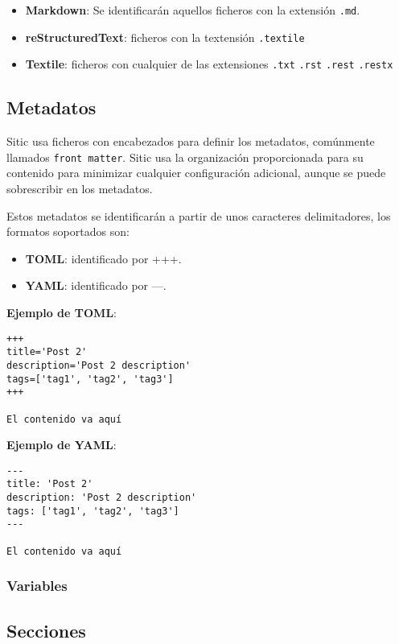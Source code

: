 \begin{itemize}
    \item \textbf{Markdown}: Se identificarán aquellos ficheros con la extensión \texttt{.md}.
    \item \textbf{reStructuredText}: ficheros con la textensión \texttt{.textile}
    \item \textbf{Textile}: ficheros con cualquier de las extensiones \texttt{.txt} \texttt{.rst} \texttt{.rest} \texttt{.restx}
\end{itemize}

\subsection{Metadatos}

Sitic usa ficheros con encabezados para definir los metadatos, comúnmente llamados \texttt{front matter}.
Sitic usa la organización proporcionada para su contenido para minimizar cualquier
configuración adicional, aunque se puede sobrescribir en los metadatos.

Estos metadatos se identificarán a partir de unos caracteres delimitadores, los formatos soportados son:

\begin{itemize}
    \item \textbf{TOML}: identificado por +++.
    \item \textbf{YAML}: identificado por ---.
\end{itemize}

\textbf{Ejemplo de TOML}:

\begin{verbatim}
+++
title='Post 2'
description='Post 2 description'
tags=['tag1', 'tag2', 'tag3']
+++

El contenido va aquí
\end{verbatim}

\textbf{Ejemplo de YAML}:

\begin{verbatim}
---
title: 'Post 2'
description: 'Post 2 description'
tags: ['tag1', 'tag2', 'tag3']
---

El contenido va aquí
\end{verbatim}

\subsubsection{Variables}

\subsection{Secciones}

